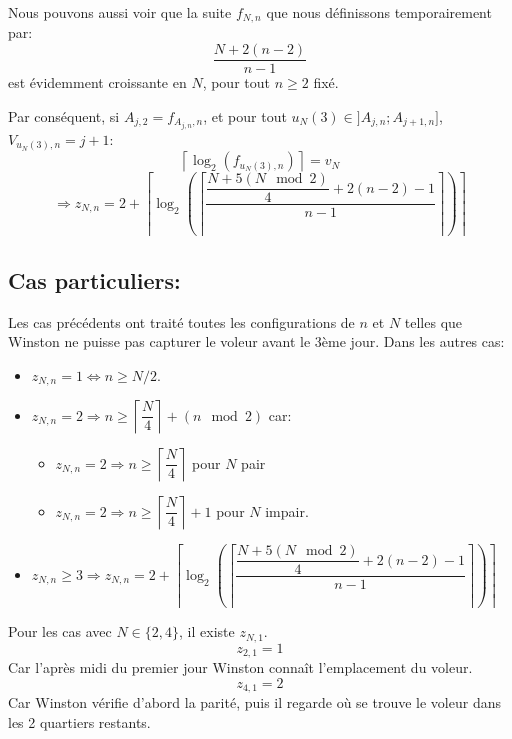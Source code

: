\medskip

Nous pouvons aussi voir que la suite $f_{N,n}$ que nous définissons temporairement par: $$\dfrac{N+2(n-2)}{n-1}$$
est évidemment croissante en $N$, pour tout $n\geq 2$ fixé.

\medskip

Par conséquent, si $A_{j,2}=f_{A_{j,n},n}$, et pour tout $u_N(3)\in ]A_{j,n};A_{j+1,n}]$, $V_{u_N(3),n}=j+1$:
$$\left\lceil \log_2(f_{u_N(3),n})\right\rceil=v_N$$
$$\Rightarrow z_{N,n}=2+\left\lceil{\log_2\left(\left\lceil{\dfrac{\dfrac{N+5(N\mod 2)}{4}+2(n-2)-1}{n-1}}\right\rceil\right)}\right\rceil$$
\subsection{Cas particuliers:}
Les cas précédents ont traité toutes les configurations de $n$ et $N$ telles que Winston ne puisse pas capturer le voleur avant le 3ème jour. Dans les autres cas:
\begin{itemize}
    \item $z_{N,n}=1\iff n\geq N/2$.
    \item $z_{N,n}=2\Rightarrow n\geq \left\lceil \dfrac{N}{4}\right\rceil+(n\mod 2)$ car:
    \begin{itemize}
        \item $z_{N,n}=2\Rightarrow n\geq \left\lceil \dfrac{N}{4}\right\rceil$ pour $N$ pair
        \item $z_{N,n}=2\Rightarrow n\geq \left\lceil \dfrac{N}{4}\right\rceil+1$ pour $N$ impair.
    \end{itemize}
    \item $z_{N,n}\geq 3\Rightarrow z_{N,n}=2+\left\lceil{\log_2\left(\left\lceil{\dfrac{\dfrac{N+5(N\mod 2)}{4}+2(n-2)-1}{n-1}}\right\rceil\right)}\right\rceil$
\end{itemize}
Pour les cas avec $N\in\{2,4\}$, il existe $z_{N,1}$.
$$z_{2,1}=1$$
Car l'après midi du premier jour Winston connaît l'emplacement du voleur.
$$z_{4,1}=2$$
Car Winston vérifie d'abord la parité, puis il regarde où se trouve le voleur dans les 2 quartiers restants.
